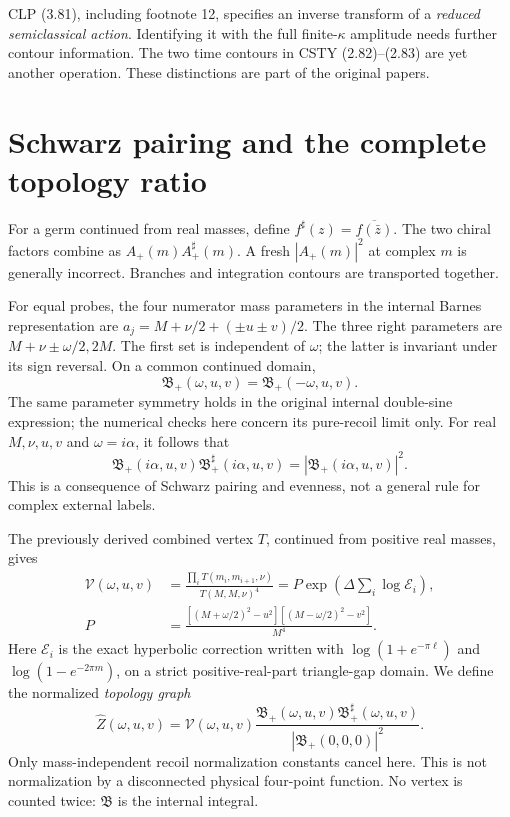 \documentclass[11pt,a4paper]{article}
\newcommand{\E}{\mathcal E}
\newcommand{\B}{\mathfrak B}
\begin{document}
CLP (3.81), including footnote 12, specifies an inverse transform
of a \emph{reduced semiclassical action}. Identifying it with the full
finite-\(\kappa\) amplitude needs further contour information.
The two time contours in CSTY (2.82)--(2.83) are yet another
operation. These distinctions are part of the original papers.

\newpage
\section{Schwarz pairing and the complete topology ratio}
For a germ continued from real masses, define
\(f^\sharp(z)=\overline{f(\bar z)}\).
The two chiral factors combine as \(A_+(m)A_+^\sharp(m)\).
A fresh \(|A_+(m)|^2\) at complex \(m\) is generally incorrect.
Branches and integration contours are transported together.

For equal probes, the four numerator mass parameters in the internal
Barnes representation are
\(a_j=M+\nu/2+(\pm u\pm v)/2\).
The three right parameters are \(M+\nu\pm\omega/2,2M\).
The first set is independent of \(\omega\); the latter is invariant
under its sign reversal. On a common continued domain,
\[
 \B_+(\omega,u,v)=\B_+(-\omega,u,v).
\]
The same parameter symmetry holds in the original internal
double-sine expression; the numerical checks here concern its
pure-recoil limit only.
For real \(M,\nu,u,v\) and \(\omega=i\alpha\), it follows that
\[
 \B_+(i\alpha,u,v)\B_+^\sharp(i\alpha,u,v)
       =|\B_+(i\alpha,u,v)|^2.                                    \tag{2}
\]
This is a consequence of Schwarz pairing and evenness,
not a general rule for complex external labels.

The previously derived combined vertex \(T\), continued from positive
real masses, gives
\begin{align*}
 \mathcal V(\omega,u,v)
 &=\frac{\prod_iT(m_i,m_{i+1},\nu)}{T(M,M,\nu)^4}
   =P\exp\!\left(\Delta\sum_i\log\E_i\right),\\
 P&=\frac{[(M+\omega/2)^2-u^2][(M-\omega/2)^2-v^2]}{M^4}.
\end{align*}
Here \(\E_i\) is the exact hyperbolic correction written with
\(\log(1+e^{-\pi\ell})\) and \(\log(1-e^{-2\pi m})\), on a strict
positive-real-part triangle-gap domain.
We define the normalized \emph{topology graph}
\[
 \widehat Z(\omega,u,v)=\mathcal V(\omega,u,v)
 \frac{\B_+(\omega,u,v)\B_+^\sharp(\omega,u,v)}
 {|\B_+(0,0,0)|^2}.                                               \tag{3}
\]
Only mass-independent recoil normalization constants cancel here.
This is not normalization by a disconnected physical four-point function.
No vertex is counted twice: \(\B\) is the internal integral.
\end{document}
